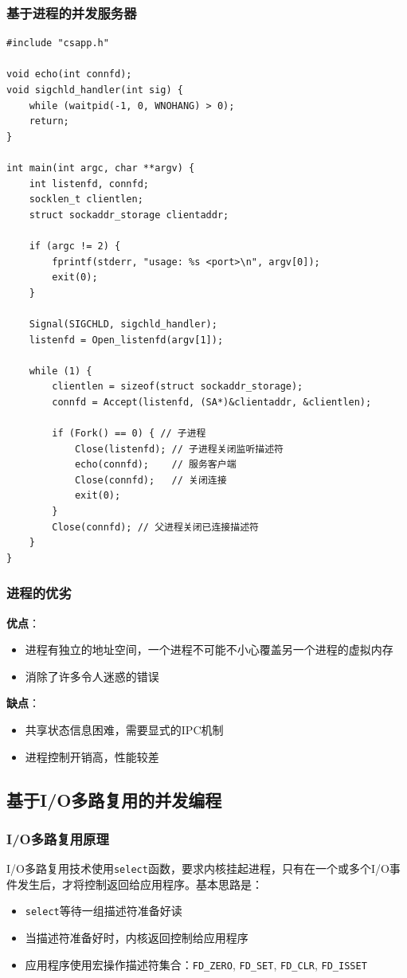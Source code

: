 \subsubsection{基于进程的并发服务器}
\begin{lstlisting}[style=CStyle]
#include "csapp.h"

void echo(int connfd);
void sigchld_handler(int sig) {
    while (waitpid(-1, 0, WNOHANG) > 0);
    return;
}

int main(int argc, char **argv) {
    int listenfd, connfd;
    socklen_t clientlen;
    struct sockaddr_storage clientaddr;
    
    if (argc != 2) {
        fprintf(stderr, "usage: %s <port>\n", argv[0]);
        exit(0);
    }
    
    Signal(SIGCHLD, sigchld_handler);
    listenfd = Open_listenfd(argv[1]);
    
    while (1) {
        clientlen = sizeof(struct sockaddr_storage);
        connfd = Accept(listenfd, (SA*)&clientaddr, &clientlen);
        
        if (Fork() == 0) { // 子进程
            Close(listenfd); // 子进程关闭监听描述符
            echo(connfd);    // 服务客户端
            Close(connfd);   // 关闭连接
            exit(0);
        }
        Close(connfd); // 父进程关闭已连接描述符
    }
}
\end{lstlisting}

\subsubsection{进程的优劣}
\textbf{优点}：
\begin{itemize}
    \item 进程有独立的地址空间，一个进程不可能不小心覆盖另一个进程的虚拟内存
    \item 消除了许多令人迷惑的错误
\end{itemize}

\textbf{缺点}：
\begin{itemize}
    \item 共享状态信息困难，需要显式的IPC机制
    \item 进程控制开销高，性能较差
\end{itemize}

\subsection{基于I/O多路复用的并发编程}

\subsubsection{I/O多路复用原理}
I/O多路复用技术使用\texttt{select}函数，要求内核挂起进程，只有在一个或多个I/O事件发生后，才将控制返回给应用程序。基本思路是：
\begin{itemize}
    \item \texttt{select}等待一组描述符准备好读
    \item 当描述符准备好时，内核返回控制给应用程序
    \item 应用程序使用宏操作描述符集合：\texttt{FD\_ZERO}, \texttt{FD\_SET}, \texttt{FD\_CLR}, \texttt{FD\_ISSET}
\end{itemize}

